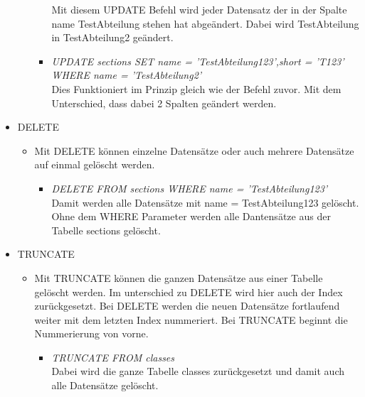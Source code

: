 \begin{itemize}
\begin{itemize}
\begin{itemize}
					Mit diesem UPDATE Befehl wird jeder Datensatz der in der Spalte name TestAbteilung stehen hat abgeändert. Dabei wird TestAbteilung in TestAbteilung2 geändert.
				\item \textit{UPDATE sections SET name = 'TestAbteilung123',short = 'T123' WHERE name = 'TestAbteilung2'}\\
					Dies Funktioniert im Prinzip gleich wie der Befehl zuvor. Mit dem Unterschied, dass dabei 2 Spalten geändert werden.
			\end{itemize}
		\end{itemize}
	\item DELETE
		\begin{itemize}
			\item Mit DELETE können einzelne Datensätze oder auch mehrere Datensätze auf einmal gelöscht werden.
			\begin{itemize}
				\item \textit{DELETE FROM sections WHERE name = 'TestAbteilung123'}\\
					Damit werden alle Datensätze mit name = TestAbteilung123 gelöscht. Ohne dem WHERE Parameter werden alle Dantensätze aus der Tabelle sections gelöscht.
			\end{itemize}
		\end{itemize}
	\item TRUNCATE
		\begin{itemize}
			\item Mit TRUNCATE können die ganzen Datensätze aus einer Tabelle gelöscht werden. Im unterschied zu DELETE wird hier auch der Index zurückgesetzt. Bei DELETE werden die neuen Datensätze fortlaufend weiter mit dem letzten Index nummeriert. Bei TRUNCATE beginnt die Nummerierung von vorne.
			\begin{itemize}
				\item \textit{TRUNCATE FROM classes}\\
					Dabei wird die ganze Tabelle classes zurückgesetzt und damit auch alle Datensätze gelöscht. 
			\end{itemize} 
			
		\end{itemize}
\end{itemize}
